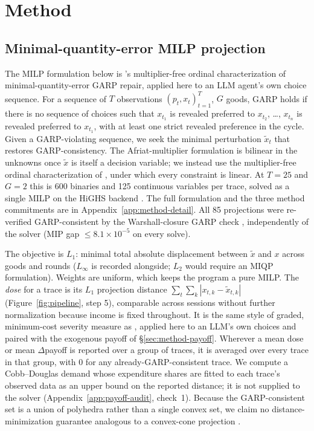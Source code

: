 \documentclass{article}
\begin{document}
\section{Method}
\label{sec:method}

\subsection{Minimal-quantity-error MILP projection}
\label{sec:method-projection}

The MILP formulation below is \citet{demuynck2023computing}'s multiplier-free ordinal
characterization of minimal-quantity-error GARP repair, applied here to an LLM agent's own choice
sequence. For a sequence of $T$ observations $(p_t, x_t)_{t=1}^T$, $G$ goods, GARP holds if there is no
sequence of choices such that $x_{t_1}$ is revealed preferred to $x_{t_2}$, \dots, $x_{t_n}$ is
revealed preferred to $x_{t_1}$, with at least one strict revealed preference in the cycle.
Given a GARP-violating sequence, we seek the minimal perturbation $\tilde{x}_t$ that restores
GARP-consistency. The Afriat-multiplier formulation is bilinear in the unknowns once
$\tilde{x}$ is itself a decision variable; we instead use the multiplier-free ordinal
characterization of \citet{demuynck2023computing}, under which every constraint is linear. At
$T=25$ and $G=2$ this is 600 binaries and 125 continuous variables per trace, solved as a single
MILP on the HiGHS backend \citep{huangfu2018parallelizing}. The full formulation and the three
method commitments are in Appendix~\ref{app:method-detail}. All 85 projections were re-verified
GARP-consistent by the Warshall-closure GARP check \citep{warshall1962theorem}, independently of
the solver (MIP gap $\le 8.1\times10^{-5}$ on every solve).

The objective is $L_1$: minimal total absolute displacement between $\tilde{x}$ and $x$ across
goods and rounds ($L_\infty$ is recorded alongside; $L_2$ would require an MIQP formulation).
Weights are uniform, which keeps the program a pure MILP. The \emph{dose} for a trace is its $L_1$
projection distance $\sum_t\sum_k |x_{t,k}-\tilde{x}_{t,k}|$ (Figure~\ref{fig:pipeline}, step 5),
comparable across sessions without further normalization because income is fixed throughout. It is
the same style of graded, minimum-cost severity measure as \citet{dean2016measuring}, applied here
to an LLM's own choices
and paired with the exogenous payoff of \S\ref{sec:method-payoff}. Wherever a mean dose or mean
$\Delta$payoff is reported over a group of traces, it is averaged over every trace in that group,
with $0$ for any already-GARP-consistent trace. We compute a Cobb--Douglas demand whose
expenditure shares are fitted to each trace's observed data as an upper bound on the reported
distance; it is not supplied to the solver (Appendix~\ref{app:payoff-audit}, check~1). Because the
GARP-consistent set is a union of polyhedra rather than a single convex set, we claim no
distance-minimization guarantee analogous to a convex-cone projection \citep{wang2026poise}.
\end{document}
